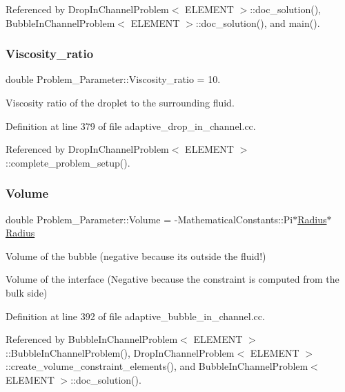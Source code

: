 Referenced by Drop\+In\+Channel\+Problem$<$ E\+L\+E\+M\+E\+N\+T $>$\+::doc\+\_\+solution(), Bubble\+In\+Channel\+Problem$<$ E\+L\+E\+M\+E\+N\+T $>$\+::doc\+\_\+solution(), and main().

\mbox{\label{namespaceProblem__Parameter_afdb95f68bd3c77e4c12001a29bd26e31}} 
\subsubsection{\texorpdfstring{Viscosity\+\_\+ratio}{Viscosity\_ratio}}
{\footnotesize\ttfamily double Problem\+\_\+\+Parameter\+::\+Viscosity\+\_\+ratio = 10.}



Viscosity ratio of the droplet to the surrounding fluid. 



Definition at line 379 of file adaptive\+\_\+drop\+\_\+in\+\_\+channel.\+cc.



Referenced by Drop\+In\+Channel\+Problem$<$ E\+L\+E\+M\+E\+N\+T $>$\+::complete\+\_\+problem\+\_\+setup().

\mbox{\label{namespaceProblem__Parameter_aad8e0a2d1ec39a8dd7357a43bcc5f20e}} 
\subsubsection{\texorpdfstring{Volume}{Volume}}
{\footnotesize\ttfamily double Problem\+\_\+\+Parameter\+::\+Volume = -\/Mathematical\+Constants\+::\+Pi$\ast$\hyperlink{namespaceProblem__Parameter_a903237528f0e9bb92debcc8842576cca}{Radius}$\ast$\hyperlink{namespaceProblem__Parameter_a903237528f0e9bb92debcc8842576cca}{Radius}}



Volume of the bubble (negative because it\textquotesingle{}s outside the fluid!) 

Volume of the interface (Negative because the constraint is computed from the bulk side) 

Definition at line 392 of file adaptive\+\_\+bubble\+\_\+in\+\_\+channel.\+cc.



Referenced by Bubble\+In\+Channel\+Problem$<$ E\+L\+E\+M\+E\+N\+T $>$\+::\+Bubble\+In\+Channel\+Problem(), Drop\+In\+Channel\+Problem$<$ E\+L\+E\+M\+E\+N\+T $>$\+::create\+\_\+volume\+\_\+constraint\+\_\+elements(), and Bubble\+In\+Channel\+Problem$<$ E\+L\+E\+M\+E\+N\+T $>$\+::doc\+\_\+solution().

